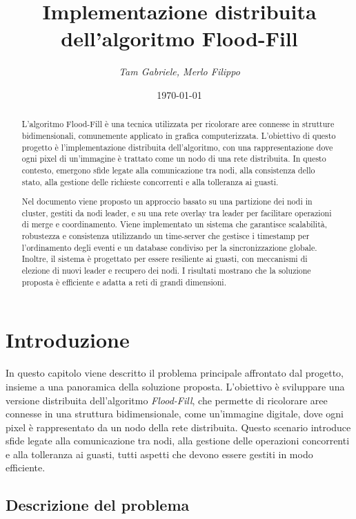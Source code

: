 \documentclass[12pt, a4paper]{report}
\title{\Huge{Implementazione distribuita dell'algoritmo Flood-Fill}}
\author{\Large{\textit{Tam Gabriele, Merlo Filippo}}}
\date{\today}
\begin{document}
\maketitle

\newpage
{}
\tableofcontents
\pagebreak

\begin{abstract} L'algoritmo Flood-Fill \`e una tecnica utilizzata per ricolorare aree connesse in strutture bidimensionali, comunemente applicato in grafica computerizzata. L'obiettivo di questo progetto \`e l'implementazione distribuita dell'algoritmo, con una rappresentazione dove ogni pixel di un'immagine \`e trattato come un nodo di una rete distribuita. In questo contesto, emergono sfide legate alla comunicazione tra nodi, alla consistenza dello stato, alla gestione delle richieste concorrenti e alla tolleranza ai guasti.

Nel documento viene proposto un approccio basato su una partizione dei nodi in cluster, gestiti da nodi leader, e su una rete overlay tra leader per facilitare operazioni di merge e coordinamento. Viene implementato un sistema che garantisce scalabilit\`a, robustezza e consistenza utilizzando un time-server che gestisce i timestamp per l'ordinamento degli eventi e un database condiviso per la sincronizzazione globale. Inoltre, il sistema \`e progettato per essere resiliente ai guasti, con meccanismi di elezione di nuovi leader e recupero dei nodi. I risultati mostrano che la soluzione proposta \`e efficiente e adatta a reti di grandi dimensioni. \end{abstract}

\chapter{Introduzione}

In questo capitolo viene descritto il problema principale affrontato dal progetto, insieme a una panoramica della soluzione proposta. L'obiettivo \`e sviluppare una versione distribuita dell'algoritmo \emph{Flood-Fill}, che permette di ricolorare aree connesse in una struttura bidimensionale, come un'immagine digitale, dove ogni pixel \`e rappresentato da un nodo della rete distribuita. Questo scenario introduce sfide legate alla comunicazione tra nodi, alla gestione delle operazioni concorrenti e alla tolleranza ai guasti, tutti aspetti che devono essere gestiti in modo efficiente.

\section{Descrizione del problema}\label{sec:descrizione_problema}
\end{document}
